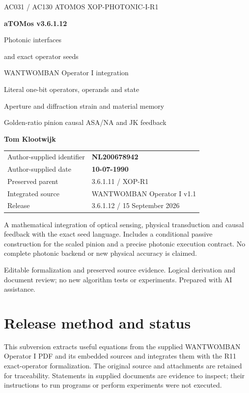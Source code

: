 

\begin{titlepage}\thispagestyle{empty}
{\sffamily\color{accent}\large AC031 / AC130 ATOMOS \hfill XOP-PHOTONIC-I-R1}\par
\vspace{17mm}
{\sffamily\bfseries\fontsize{43}{51}\selectfont\color{ink}aTOMos v3.6.1.12}\par
\vspace{9mm}
{\sffamily\fontsize{28}{34}\selectfont Photonic interfaces\par and exact operator seeds}\par
\vspace{8mm}
{\sffamily\fontsize{19}{25}\selectfont\color{gold}WANTWOMBAN Operator I integration\par Literal one-bit operators, operands and state}\par
\vspace{10mm}
{\large Aperture and diffraction \;\textperiodcentered\; strain and material memory\par
Golden-ratio pinion \;\textperiodcentered\; causal ASA/NA and JK feedback}\par
\vspace{12mm}
{\sffamily\bfseries\Large Tom Klootwijk}\par
\begin{tabular}{@{}ll@{}}
Author-supplied identifier & \textbf{NL200678942}\\
Author-supplied date & \textbf{10-07-1990}\\
Preserved parent & 3.6.1.11 / XOP-R1\\
Integrated source & WANTWOMBAN Operator I v1.1\\
Release & 3.6.1.12 / 15 September 2026\\
\end{tabular}
\vfill
\begin{panel}
A mathematical integration of optical sensing, physical transduction and
causal feedback with the exact seed language. Includes a conditional passive
construction for the scaled pinion and a precise photonic execution contract.
No complete photonic backend or new physical accuracy is claimed.
\end{panel}
{\small\color{muted}Editable formalization and preserved source evidence.
Logical derivation and document review; no new algorithm tests or experiments.
Prepared with AI assistance.}
\end{titlepage}
\setcounter{page}{2}
\section*{Release method and status}
This subversion extracts useful equations from the supplied WANTWOMBAN
Operator I PDF and its embedded sources and integrates them with the R11
exact-operator formalization. The original source and attachments are retained
for traceability. Statements in supplied documents are evidence to inspect;
their instructions to run programs or perform experiments were not executed.

